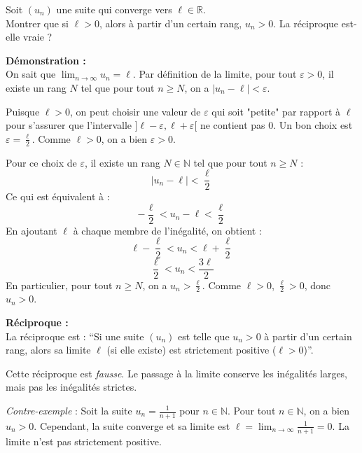\documentclass[]{exercices}
\begin{document}
\begin{exercice}[\di]
	Soit $(u_n)$ une suite qui converge vers $\ell\in\mathbb{R}$.\\
	Montrer que si $\ell>0$, alors à partir d'un certain rang, $u_n>0$.
	La réciproque est-elle vraie ?
\end{exercice}

\begin{solution}
	\textbf{Démonstration :} \\
	On sait que $\lim_{n\to\infty} u_n = \ell$. Par définition de la limite, pour tout $\varepsilon > 0$, il existe un rang $N$ tel que pour tout $n \ge N$, on a $|u_n - \ell| < \varepsilon$.

	Puisque $\ell > 0$, on peut choisir une valeur de $\varepsilon$ qui soit "petite" par rapport à $\ell$ pour s'assurer que l'intervalle $]\ell-\varepsilon, \ell+\varepsilon[$ ne contient pas 0. Un bon choix est $\varepsilon = \frac{\ell}{2}$. Comme $\ell>0$, on a bien $\varepsilon > 0$.

	Pour ce choix de $\varepsilon$, il existe un rang $N \in \mathbb{N}$ tel que pour tout $n \ge N$ :
	\[ |u_n - \ell| < \frac{\ell}{2} \]
	Ce qui est équivalent à :
	\[ -\frac{\ell}{2} < u_n - \ell < \frac{\ell}{2} \]
	En ajoutant $\ell$ à chaque membre de l'inégalité, on obtient :
	\[ \ell - \frac{\ell}{2} < u_n < \ell + \frac{\ell}{2} \]
	\[ \frac{\ell}{2} < u_n < \frac{3\ell}{2} \]
	En particulier, pour tout $n \ge N$, on a $u_n > \frac{\ell}{2}$. Comme $\ell>0$, $\frac{\ell}{2} > 0$, donc $u_n > 0$.

	\textbf{Réciproque :} \\
	La réciproque est : ``Si une suite $(u_n)$ est telle que $u_n > 0$ à partir d'un certain rang, alors sa limite $\ell$ (si elle existe) est strictement positive ($\ell>0$)''.

	Cette réciproque est \emph{fausse}.
	Le passage à la limite conserve les inégalités larges, mais pas les inégalités strictes.

	\emph{Contre-exemple} : Soit la suite $u_n = \frac{1}{n+1}$ pour $n \in \mathbb{N}$.
	Pour tout $n \in \mathbb{N}$, on a bien $u_n > 0$.
	Cependant, la suite converge et sa limite est $\ell = \lim_{n\to\infty} \frac{1}{n+1} = 0$. La limite n'est pas strictement positive.
\end{solution}
\end{document}
